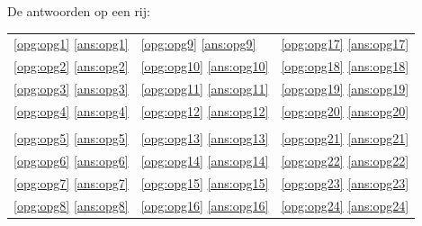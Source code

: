 \documentclass[a4paper,12pt,fleqn,dutch]{tisdexam}
\begin{document}
\begin{questions}
\bigskip\bigskip
De antwoorden op een rij:
\medskip

\begin{tabular}{p{5cm} p{5cm} p{5cm}}
  \ref{opg:opg1} \ref{ans:opg1} & \ref{opg:opg9} \ref{ans:opg9}   & \ref{opg:opg17} \ref{ans:opg17} \\ 
  \ref{opg:opg2} \ref{ans:opg2} & \ref{opg:opg10} \ref{ans:opg10} & \ref{opg:opg18} \ref{ans:opg18} \\ 
  \ref{opg:opg3} \ref{ans:opg3} & \ref{opg:opg11} \ref{ans:opg11} & \ref{opg:opg19} \ref{ans:opg19} \\ 
  \ref{opg:opg4} \ref{ans:opg4} & \ref{opg:opg12} \ref{ans:opg12} & \ref{opg:opg20} \ref{ans:opg20} \\ 
                                &                                 &                                 \\ 
  \ref{opg:opg5} \ref{ans:opg5} & \ref{opg:opg13} \ref{ans:opg13} & \ref{opg:opg21} \ref{ans:opg21} \\ 
  \ref{opg:opg6} \ref{ans:opg6} & \ref{opg:opg14} \ref{ans:opg14} & \ref{opg:opg22} \ref{ans:opg22} \\ 
  \ref{opg:opg7} \ref{ans:opg7} & \ref{opg:opg15} \ref{ans:opg15} & \ref{opg:opg23} \ref{ans:opg23} \\ 
  \ref{opg:opg8} \ref{ans:opg8} & \ref{opg:opg16} \ref{ans:opg16} & \ref{opg:opg24} \ref{ans:opg24} \\ 
\end{tabular}   



\end{questions}
\end{document}
